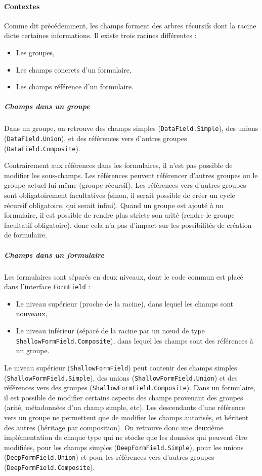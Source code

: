 \paragraph{Contextes}
Comme dit précédemment, les champs forment des arbres récursifs dont la racine dicte certaines informations.
Il existe trois racines différentes :
\begin{itemize}
	\item Les groupes,
	\item Les champs concrets d'un formulaire,
	\item Les champs référence d'un formulaire.
\end{itemize}

\subparagraph{Champs dans un groupe}
Dans un groupe, on retrouve des champs simples (\lstinline{DataField.Simple}), des unions (\lstinline{DataField.Union}), et des références vers d'autres groupes (\lstinline{DataField.Composite}).

Contrairement aux références dans les formulaires, il n'est pas possible de modifier les sous-champs.
Les références peuvent référencer d'autres groupes ou le groupe actuel lui-même (groupe récursif).
Les références vers d'autres groupes sont obligatoirement facultatives (sinon, il serait possible de créer un cycle récursif obligatoire, qui serait infini).
Quand un groupe est ajouté à un formulaire, il est possible de rendre plus stricte son arité (rendre le groupe facultatif obligatoire), donc cela n'a pas d'impact sur les possibilités de création de formulaire.

\subparagraph{Champs dans un formulaire}
Les formulaires sont séparés en deux niveaux, dont le code commun est placé dans l'interface \lstinline{FormField} :
\begin{itemize}
	\item Le niveau supérieur (proche de la racine), dans lequel les champs sont nouveaux,
	\item Le niveau inférieur (séparé de la racine par un nœud de type \lstinline{ShallowFormField.Composite}), dans lequel les champs sont des références à un groupe.
\end{itemize}

Le niveau supérieur (\lstinline{ShallowFormField}) peut contenir des champs simples (\lstinline{ShallowFormField.Simple}), des unions (\lstinline{ShallowFormField.Union}) et des références vers des groupes (\lstinline{ShallowFormField.Composite}).
Dans un formulaire, il est possible de modifier certains aspects des champs provenant des groupes (arité, métadonnées d'un champ simple, etc).
Les descendants d'une référence vers un groupe ne permettent que de modifier les champs autorisés, et héritent des autres (héritage par composition).
On retrouve donc une deuxième implémentation de chaque type qui ne stocke que les données qui peuvent être modifiées, pour les champs simples (\lstinline{DeepFormField.Simple}), pour les unions (\lstinline{DeepFormField.Union}) et pour les références vers d'autres groupes (\lstinline{DeepFormField.Composite}).
